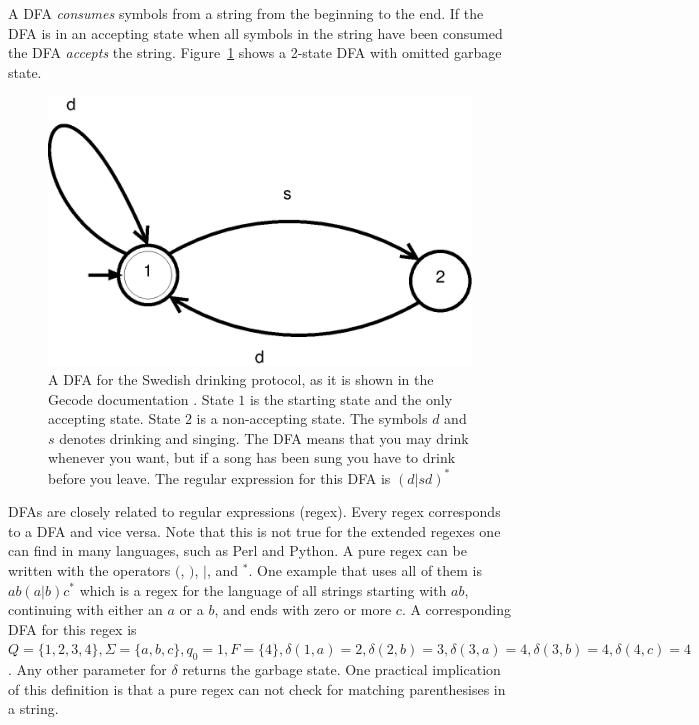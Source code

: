 \documentclass[a4paper,11pt]{article}
\begin{document}
A DFA \textit{consumes} symbols from a string from the beginning to the end. If the DFA is in an accepting state when all symbols in the string have been consumed the DFA \textit{accepts} the string. Figure~\ref{fig:dfasdp} shows a 2-state DFA with omitted garbage state.

\begin{figure}[H]
\centering
\includegraphics[scale=0.6]{dfa.eps}
\caption{A DFA for the Swedish drinking protocol, as it is shown in the Gecode documentation \cite{mpg}. State $1$ is the starting state and the only accepting state. State $2$ is a non-accepting state. The symbols $d$ and $s$ denotes drinking and singing. The DFA means that you may drink whenever you want, but if a song has been sung you have to drink before you leave. The regular expression for this DFA is $(d|sd)^{*}$}
\label{fig:dfasdp}
\end{figure}


DFAs are closely related to regular expressions (regex). Every regex corresponds to a DFA and vice versa. Note that this is not true for the extended regexes one can find in many languages, such as Perl and Python. A pure regex can be written with the operators $($, $)$, $|$, and $^{*}$. One example that uses all of them is $ab(a|b)c^{*}$ which is a regex for the language of all strings starting with $ab$, continuing with either an $a$ or a $b$, and ends with zero or more $c$. A corresponding DFA for this regex is $Q=\{1,2,3,4\}, \Sigma=\{a,b,c\}, q_0=1, F=\{4\}, \delta(1,a)=2, \delta(2,b)=3, \delta(3,a)=4, \delta(3,b)=4, \delta(4,c)=4$. Any other parameter for $\delta$ returns the garbage state. One practical implication of this definition is that a pure regex can not check for matching parenthesises in a string.
\end{document}
